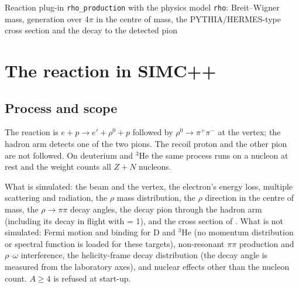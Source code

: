 \documentclass{simcnote}
\begin{document}
%
  {Reaction plug-in \texttt{rho\_production} with the physics model \texttt{rho}: Breit--Wigner mass, generation over
   4\texorpdfstring{$\pi$}{pi} in the centre of mass, the PYTHIA/HERMES-type cross section and the decay to the detected pion}
\simcnotemaketitle
{}
\simcnotetoc

\section{The reaction in SIMC++}

\subsection{Process and scope}
The reaction is $e + p \to e' + \rho^0 + p$ followed by $\rho^0\to\pi^+\pi^-$ at the vertex; the hadron arm detects one
of the two pions. The recoil proton and the other pion are not followed. On deuterium and $^3$He the same process runs on
a nucleon at rest and the weight counts all $Z+N$ nucleons.

What is simulated: the beam and the vertex, the electron's energy loss, multiple scattering and radiation, the
$\rho$ mass distribution, the $\rho$ direction in the centre of mass, the $\rho\to\pi\pi$ decay angles, the decay pion
through the hadron arm (including its decay in flight with  = 1), and the cross section of
. What is not simulated: Fermi motion and binding for D and $^3$He (no momentum distribution or
spectral function is loaded for these targets), non-resonant $\pi\pi$ production and $\rho$--$\omega$ interference,
the helicity-frame decay distribution (the decay angle is measured from the laboratory axes), and nuclear effects
other than the nucleon count. $A\ge4$ is refused at start-up.
\end{document}
